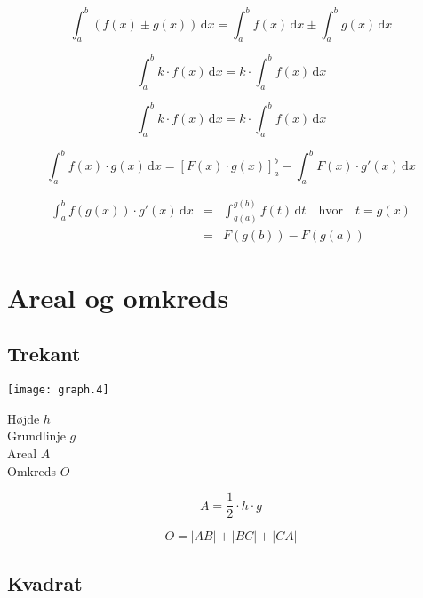 \documentclass[11pt,a4paper,landscape,twocolumn,fleqn,leqno]{article}
\begin{document}
\begin{equation}
\int_a^b \left(f(x) \pm g(x)\right)\, \mathrm{d}x = \int_a^b f(x)\, \mathrm{d}x \pm \int_a^b g(x)\, \mathrm{d}x
\end{equation}

\begin{equation}
\int_a^b k \cdot f(x)\, \mathrm{d}x = k \cdot \int_a^b f(x)\, \mathrm{d}x
\end{equation}

\begin{equation}
\int_a^b k \cdot f(x)\, \mathrm{d}x = k \cdot \int_a^b f(x)\, \mathrm{d}x
\end{equation}

\begin{equation}
\int_a^b f(x) \cdot g(x)\, \mathrm{d}x = \left[F(x) \cdot g(x) \right]_a^b - \int_a^b F(x) \cdot g'(x)\, \mathrm{d}x
\end{equation}

\begin{eqnarray}
\int_a^b f(g(x)) \cdot g'(x)\, \mathrm{d}x & = & \int_{g(a)}^{g(b)} f(t)\, \mathrm{d}t  \quad \mbox{hvor} \quad t = g(x) \\
 & = & F(g(b)) - F(g(a)) \nonumber
\end{eqnarray}

\section{Areal og omkreds}

\subsection{Trekant}

\texttt{[image: graph.4]}

Højde $h$ \\
Grundlinje $g$ \\
Areal $A$ \\
Omkreds $O$

\begin{equation}
A = \frac{1}{2} \cdot h \cdot g
\end{equation}

\begin{equation}
O = |AB| + |BC| + |CA|
\end{equation}

\vfill

\subsection{Kvadrat}
\end{document}
